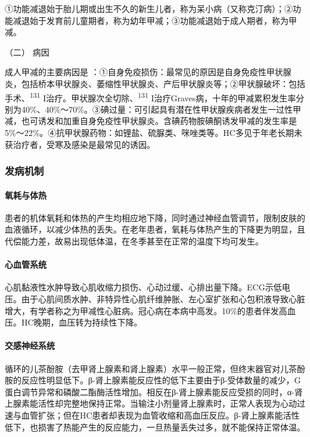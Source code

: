①功能减退始于胎儿期或出生不久的新生儿者，称为呆小病（又称克汀病）；②功能减退始于发育前儿童期者，称为幼年甲减；③功能减退始于成人期者，称为甲减。

\hypertarget{text00114.htmlux5cux23CHP4-10-1-1-2}{}
（二） 病因

成人甲减的主要病因是
：①自身免疫损伤：最常见的原因是自身免疫性甲状腺炎，包括桥本甲状腺炎、萎缩性甲状腺炎、产后甲状腺炎等；②甲状腺破坏：包括手术、\textsuperscript{131}
I治疗。甲状腺次全切除、\textsuperscript{131}
I治疗Graves病，十年的甲减累积发生率分别为40\%、40\%～70\%。③碘过量：可引起具有潜在性甲状腺疾病者发生一过性甲减，也可诱发和加重自身免疫性甲状腺炎。含碘药物胺碘酮诱发甲减的发生率是5\%～22\%。④抗甲状腺药物：如锂盐、硫脲类、咪唑类等。HC多见于年老长期未获治疗者，受寒及感染是最常见的诱因。

\subsubsection{发病机制}

\paragraph{氧耗与体热}

患者的机体氧耗和体热的产生均相应地下降，同时通过神经血管调节，限制皮肤的血液循环，以减少体热的丢失。在老年患者，氧耗与体热产生的下降更为明显，且代偿能力差，故易出现低体温，在冬季甚至在正常的温度下均可发生。

\paragraph{心血管系统}

心肌黏液性水肿导致心肌收缩力损伤、心动过缓、心排出量下降。ECG示低电压。由于心肌间质水肿、非特异性心肌纤维肿胀、左心室扩张和心包积液导致心脏增大，有学者称之为甲减性心脏病。冠心病在本病中高发。10\%的患者伴发高血压。HC晚期，血压转为持续性下降。

\paragraph{交感神经系统}

循环的儿茶酚胺（去甲肾上腺素和肾上腺素）水平一般正常，但终末器官对儿茶酚胺的反应性明显低下。β-肾上腺素能反应性的低下主要由于β-受体数量的减少，G蛋白调节异常和磷酸二酯酶活性增加。相反在β-肾上腺素能反应受损的同时，α-肾上腺素能活性却完整地保持正常。当输注小剂量肾上腺素时，正常人表现为心动过速与血管扩张；但在HC患者却表现为血管收缩和高血压反应。β-肾上腺素能活性低下，也损害了热能产生的反应能力，一旦热量丢失过多，就不能保持正常体温。

